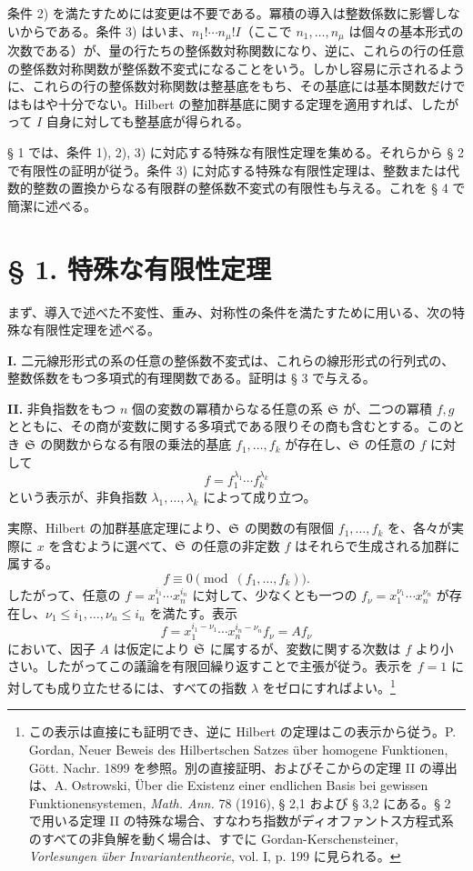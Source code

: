 条件 2) を満たすためには変更は不要である。冪積の導入は整数係数に影響しないからである。条件 3) はいま、\(n_1!\cdots n_\mu! I\)（ここで \(n_1,\ldots,n_\mu\) は個々の基本形式の次数である）が、量の行たちの整係数対称関数になり、逆に、これらの行の任意の整係数対称関数が整係数不変式になることをいう。しかし容易に示されるように、これらの行の整係数対称関数は整基底をもち、その基底には基本関数だけではもはや十分でない。Hilbert の整加群基底に関する定理を適用すれば、したがって \(I\) 自身に対しても整基底が得られる。

§ 1 では、条件 1), 2), 3) に対応する特殊な有限性定理を集める。それらから § 2 で有限性の証明が従う。条件 3) に対応する特殊な有限性定理は、整数または代数的整数の置換からなる有限群の整係数不変式の有限性も与える。これを § 4 で簡潔に述べる。

\section*{§ 1. 特殊な有限性定理}

まず、導入で述べた不変性、重み、対称性の条件を満たすために用いる、次の特殊な有限性定理を述べる。

\textbf{I.} 二元線形形式の系の任意の整係数不変式は、これらの線形形式の行列式の、整数係数をもつ多項式的有理関数である。証明は § 3 で与える。

\textbf{II.} 非負指数をもつ \(n\) 個の変数の冪積からなる任意の系 \(\mathfrak S\) が、二つの冪積 \(f,g\) とともに、その商が変数に関する多項式である限りその商も含むとする。このとき \(\mathfrak S\) の関数からなる有限の乗法的基底 \(f_1,\ldots,f_k\) が存在し、\(\mathfrak S\) の任意の \(f\) に対して
\[
        f=f_1^{\lambda_1}\cdots f_k^{\lambda_k}
\]
という表示が、非負指数 \(\lambda_1,\ldots,\lambda_k\) によって成り立つ。

実際、Hilbert の加群基底定理により、\(\mathfrak S\) の関数の有限個 \(f_1,\ldots,f_k\) を、各々が実際に \(x\) を含むように選べて、\(\mathfrak S\) の任意の非定数 \(f\) はそれらで生成される加群に属する。
\[
        f\equiv0\pmod{(f_1,\ldots,f_k)}.
\]
したがって、任意の \(f=x_1^{i_1}\cdots x_n^{i_n}\) に対して、少なくとも一つの \(f_\nu=x_1^{\nu_1}\cdots x_n^{\nu_n}\) が存在し、\(\nu_1\le i_1,\ldots,\nu_n\le i_n\) を満たす。表示
\[
        f=x_1^{i_1-\nu_1}\cdots x_n^{i_n-\nu_n} f_\nu = A f_\nu
\]
において、因子 \(A\) は仮定により \(\mathfrak S\) に属するが、変数に関する次数は \(f\) より小さい。したがってこの議論を有限回繰り返すことで主張が従う。表示を \(f=1\) に対しても成り立たせるには、すべての指数 \(\lambda\) をゼロにすればよい。\footnote{この表示は直接にも証明でき、逆に Hilbert の定理はこの表示から従う。P. Gordan, Neuer Beweis des Hilbertschen Satzes über homogene Funktionen, Gött. Nachr. 1899 を参照。別の直接証明、およびそこからの定理 II の導出は、A. Ostrowski, Über die Existenz einer endlichen Basis bei gewissen Funktionensystemen, \emph{Math. Ann.} 78 (1916), § 2,1 および § 3,2 にある。§ 2 で用いる定理 II の特殊な場合、すなわち指数がディオファントス方程式系のすべての非負解を動く場合は、すでに Gordan-Kerschensteiner, \emph{Vorlesungen über Invariantentheorie}, vol. I, p. 199 に見られる。}

